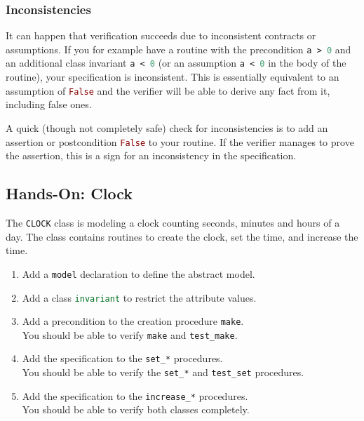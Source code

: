 \documentclass[a4paper,12pt]{article}
\newcommand{\e}[1]{\mbox{\lstinline[language=Eiffel]|#1|}}
\begin{document}
\subsubsection*{Inconsistencies}

It can happen that verification succeeds due to inconsistent contracts or assumptions. If you for example have a routine with the precondition \e{a > 0} and an additional class invariant \e{a < 0} (or an assumption \e{a < 0} in the body of the routine), your specification is inconsistent. This is essentially equivalent to an assumption of \e{False} and the verifier will be able to derive any fact from it, including false ones.

A quick (though not completely safe) check for inconsistencies is to add an assertion or postcondition \e{False} to your routine. If the verifier manages to prove the assertion, this is a sign for an inconsistency in the specification.


\subsection{Hands-On: Clock}

The \e{CLOCK} class is modeling a clock counting seconds, minutes and hours of a day. The class contains routines to create the clock, set the time, and increase the time.

\begin{enumerate}[label=\bfseries Task \arabic*:, leftmargin=1.8cm]
\item Add a \e{model} declaration to define the abstract model.
\item Add a class \e{invariant} to restrict the attribute values.
\item Add a precondition to the creation procedure \e{make}. \\ 
      You should be able to verify \e{make} and \e{test_make}.
\item Add the specification to the \e{set_*} procedures. \\ 
      You should be able to verify the \e{set_*} and \e{test_set} procedures.
\item Add the specification to the \e{increase_*} procedures. \\
      You should be able to verify both classes completely.
\end{enumerate}
\end{document}
